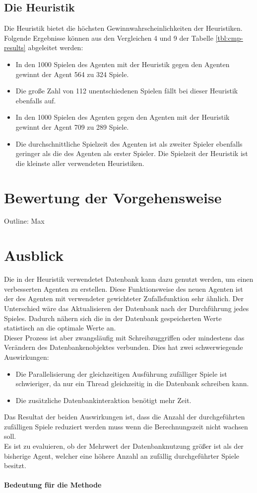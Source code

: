 \subsection{Die Heuristik }
Die  Heuristik bietet die höchsten Gewinnwahrscheinlichkeiten der  Heuristiken. Folgende Ergebnisse können aus den Vergleichen 4 und 9 der Tabelle \ref{tbl:cmp-results} abgeleitet werden:
\begin{itemize}
\item In den 1000 Spielen des  Agenten mit der  Heuristik gegen den  Agenten gewinnt der  Agent 564 zu 324 Spiele.
\item Die große Zahl von 112 unentschiedenen Spielen fällt bei dieser Heuristik ebenfalls auf.
\item In den 1000 Spielen des  Agenten gegen den  Agenten mit der  Heuristik gewinnt der  Agent 709 zu 289 Spiele.
\item Die durchschnittliche Spielzeit des Agenten ist als zweiter Spieler ebenfalls geringer als die des Agenten als erster Spieler. Die Spielzeit der  Heuristik ist die kleinste aller verwendeten Heuristiken.
\end{itemize}

\section{Bewertung der Vorgehensweise}
Outline: Max

\section{Ausblick}
Die in der  Heuristik verwendetet Datenbank kann dazu genutzt werden, um einen verbesserten Agenten zu erstellen. Diese Funktionsweise des neuen Agenten ist der des  Agenten mit verwendeter gewichteter Zufallsfunktion sehr ähnlich. Der Unterschied wäre das Aktualisieren der Datenbank nach der Durchführung jedes Spieles. Dadurch nähern sich die in der Datenbank gespeicherten Werte statistisch an die optimale Werte an.
\\Dieser Prozess ist aber zwangsläufig mit Schreibzuggriffen oder mindestens das Verändern des Datenbankenobjektes verbunden. Dies hat zwei schwerwiegende Auswirkungen:
\begin{itemize}
\item Die Parallelisierung der gleichzeitigen Ausführung zufälliger Spiele ist schwieriger, da nur ein Thread gleichzeitig in die Datenbank schreiben kann.
\item Die zusätzliche Datenbankinteraktion benötigt mehr Zeit.
\end{itemize}
Das Resultat der beiden Auswirkungen ist, dass die Anzahl der durchgeführten zufälligen Spiele reduziert werden muss wenn die Berechnungszeit nicht wachsen soll.
\\Es ist zu evaluieren, ob der Mehrwert der Datenbanknutzung größer ist als der bisherige  Agent, welcher eine höhere Anzahl an zufällig durchgeführter Spiele besitzt.
\paragraph{Bedeutung für die Methode}

